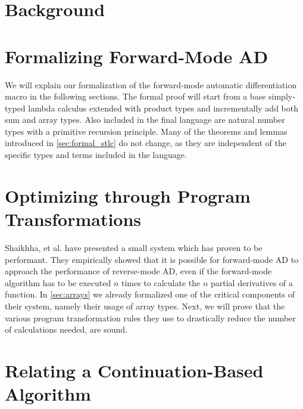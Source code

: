 \documentclass[11pt, final]{article}
\begin{document}

\newpage


\newpage

\setcounter{page}{3}
\tableofcontents
\newpage


\section{Background}\label{sec:bg}





% 

\section{Formalizing Forward-Mode AD}\label{sec:forward}
  We will explain our formalization of the forward-mode automatic differentiation macro in the following sections.
  The formal proof will start from a base simply-typed lambda calculus extended with product types and incrementally add both sum and array types.
  Also included in the final language are natural number types with a primitive recursion principle.
  Many of the theorems and lemmas introduced in \cref{sec:formal_stlc} do not change, as they are independent of the specific types and terms included in the language.
  
  
  
\section{Optimizing through Program Transformations}\label{sec:opt}
  Shaikhha, et al. have presented a small system which has proven to be performant\cite{Shaikha2019}.
  They empirically showed that it is possible for forward-mode AD to approach the performance of reverse-mode AD, even if the forward-mode algorithm has to be executed $n$ times to calculate the $n$ partial derivatives of a function.
  In \cref{sec:arrays} we already formalized one of the critical components of their system, namely their usage of array types.
  Next, we will prove that the various program transformation rules they use to drastically reduce the number of calculations needed, are sound.

  
\section{Relating a Continuation-Based Algorithm}\label{sec:continuation-base}
  
\end{document}
